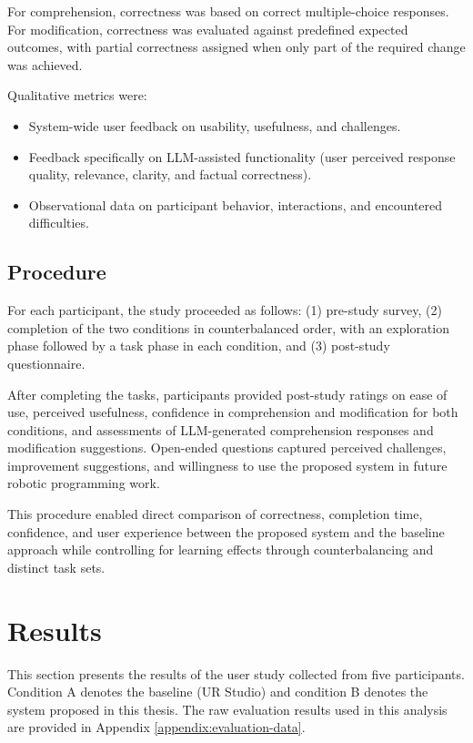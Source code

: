 For comprehension, correctness was based on correct multiple-choice responses. For modification, correctness was evaluated against predefined expected outcomes, with partial correctness assigned when only part of the required change was achieved.

Qualitative metrics were:
\begin{itemize}
    \item System-wide user feedback on usability, usefulness, and challenges.
    \item Feedback specifically on LLM-assisted functionality (user perceived response quality, relevance, clarity, and factual correctness).
    \item Observational data on participant behavior, interactions, and encountered difficulties.
\end{itemize}

\subsection{Procedure}
For each participant, the study proceeded as follows: (1) pre-study survey, (2) completion of the two conditions in counterbalanced order, with an exploration phase followed by a task phase in each condition, and (3) post-study questionnaire.

After completing the tasks, participants provided post-study ratings on ease of use, perceived usefulness, confidence in comprehension and modification for both conditions, and assessments of LLM-generated comprehension responses and modification suggestions. Open-ended questions captured perceived challenges, improvement suggestions, and willingness to use the proposed system in future robotic programming work.

This procedure enabled direct comparison of correctness, completion time, confidence, and user experience between the proposed system and the baseline approach while controlling for learning effects through counterbalancing and distinct task sets.


\section{Results} \label{sec:evaluation:results}
This section presents the results of the user study collected from five participants. Condition A denotes the baseline (UR Studio) and condition B denotes the system proposed in this thesis. The raw evaluation results used in this analysis are provided in Appendix \ref{appendix:evaluation-data}.

